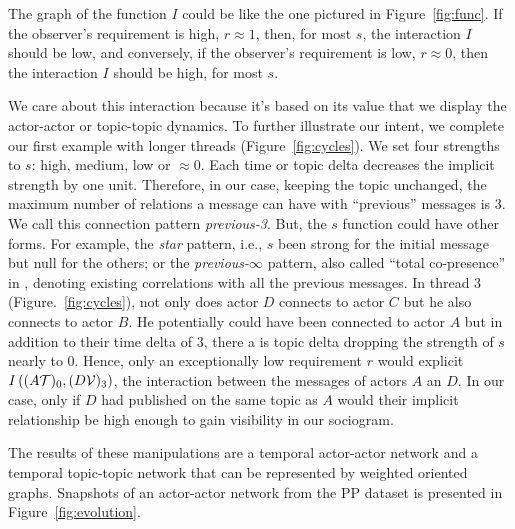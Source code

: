 \documentclass[a4paper,twoside]{article}
\newcommand{\V}{\mathcal{V}}
\begin{document}


The graph of the function $I$ could be like the one pictured in Figure~\ref{fig:func}.  If the observer's requirement is high, $r\approx{} 1$, then, for most $s$, the interaction $I$ should be low, and conversely, if the observer's requirement is low, $r\approx{} 0$, then the interaction $I$ should be high, for most $s$.

We care about this interaction because it's based on its value that we display the actor-actor or topic-topic dynamics.  To further illustrate our intent, we complete our first example with longer threads (Figure~\ref{fig:cycles}).  We set four strengths to $s$: high, medium, low or $\approx 0$.  Each time or topic delta decreases the implicit strength by one unit.  Therefore, in our case, keeping the topic unchanged, the maximum number of relations a message can have with ``previous'' messages is 3.  We call this connection pattern \emph{previous-3}.  But, the $s$ function could have other forms.  For example, the \emph{star} pattern, i.e., $s$ been strong for the initial message but null for the others; or the \emph{previous-}$\infty$ pattern, also called ``total co-presence'' in \cite{Wise2017}, denoting existing correlations with all the previous messages.
In thread 3 (Figure.~\ref{fig:cycles}), not only does actor $D$ connects to actor $C$ but he also connects to actor $B$.  He potentially could have been connected to actor $A$ but in addition to their time delta of 3, there a is topic delta dropping the strength of $s$ nearly to 0.  Hence, only an exceptionally low requirement $r$ would explicit $I\left ((A\T)_0,(D\V)_3 \right )$, the interaction between the messages of actors $A$ an $D$.   In our case, only if $D$ had published on the same topic as $A$ would their implicit relationship be high enough to gain visibility in our sociogram.

The results of these manipulations are a temporal actor-actor network and a temporal topic-topic network that can be represented by weighted oriented graphs.  Snapshots of an actor-actor network from the PP dataset is presented in Figure~\ref{fig:evolution}.
\end{document}

